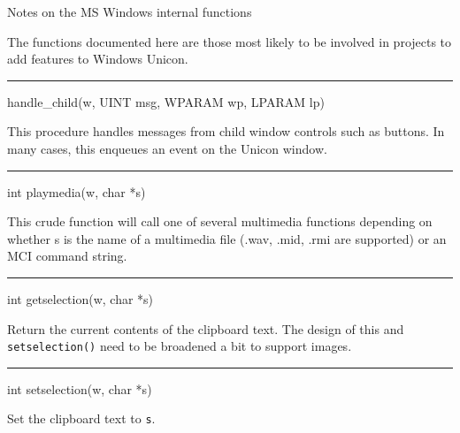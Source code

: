 {\sffamily
Notes on the MS Windows internal functions}


The functions documented here are those most likely to be involved in
projects to add features to Windows Unicon.

{\sffamily\bfseries
\bigskip\hrule\vspace{0.1cm}
\noindent
handle\_child(w, UINT msg, WPARAM wp, LPARAM lp)}


This procedure handles messages from child window controls such as
buttons. In many cases, this enqueues an event on the Unicon window.


\bigskip\hrule\vspace{0.1cm}
\noindent
int playmedia(w, char *s)


This crude function will call one of several multimedia functions
depending on whether s is the name of a multimedia file (.wav, .mid,
.rmi are supported) or an MCI command string.


\bigskip\hrule\vspace{0.1cm}
\noindent
int getselection(w, char *s)


Return the current contents of the clipboard text. The design of this
and \texttt{setselection()} need to be broadened a bit to support
images.


\bigskip\hrule\vspace{0.1cm}
\noindent
int setselection(w, char *s)


Set the clipboard text to \texttt{s}.

